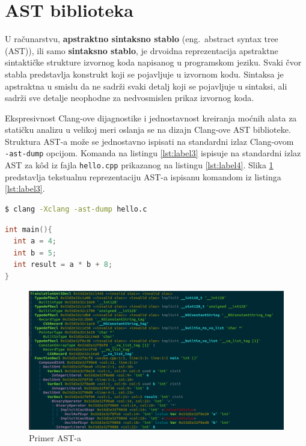 \documentclass[12pt,oneside]{memoir}
\begin{document}
\section{AST biblioteka}

U računarstvu, \textbf{apstraktno sintaksno stablo} (eng.~abstract syntax tree (AST)), ili samo \textbf{sintaksno stablo}, je drvoidna reprezentacija apstraktne sintaktičke strukture izvornog koda napisanog u programskom jeziku. Svaki čvor stabla predstavlja konstrukt koji se pojavljuje u izvornom kodu.
Sintaksa je apstraktna u smislu da ne sadr\v{z}i svaki detalj koji se pojavljuje u sintaksi, ali sadr\v{z}i sve detalje neophodne za nedvosmislen prikaz izvornog koda.

Ekspresivnost Clang-ove dijagnostike i jednostavnost kreiranja mo\'{c}nih alata za stati\v{c}ku analizu u velikoj meri oslanja se na dizajn Clang-ove AST biblioteke. Struktura AST-a mo\v{z}e se jednostavno ispisati na standardni izlaz Clang-ovom \\ \texttt{-ast-dump} opcijom. Komanda na listingu \ref{lst:label3} ispisuje na standardni izlaz AST za k\^{o}d  iz fajla \texttt{hello.cpp} prikazanog na listingu \ref{lst:label4}. Slika \ref{fig:grafikon} predstavlja tekstualnu reprezentaciju AST-a ispisanu komandom iz listinga \ref{lst:label3}.
\\


\begin{lstlisting}[caption={Komanda za ispisivanje Clang-ovog AST-a},label=lst:label3,language=bash, captionpos=b]
$ clang -Xclang -ast-dump hello.c
\end{lstlisting}

\begin{lstlisting}[style=customc, caption={Kod \v{c}iji je AST prikazan na slici 4.1},label=lst:label4,language=C++, captionpos=b]
int main(){
  int a = 4;
  int b = 5;
  int result = a * b + 8;
}
\end{lstlisting}

\begin{figure}[!ht]
  \centering
  \includegraphics[width=1.0\textwidth]{ASTImage.png}
  \caption{Primer AST-a}
  \label{fig:grafikon}
\end{figure}
\end{document}
